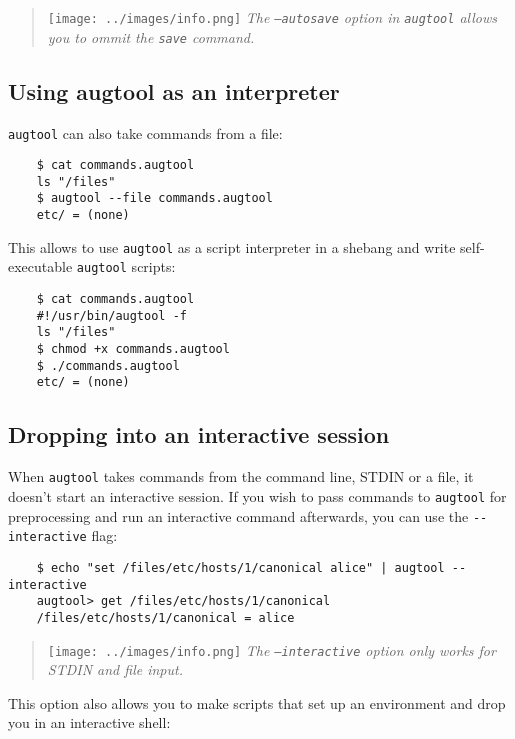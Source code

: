 
\begin{quote}
\texttt{[image: ../images/info.png]} \emph{The \texttt{--autosave} option in \texttt{augtool} allows you to ommit the \texttt{save} command.}

\end{quote}
\subsection{Using augtool as an interpreter}

\verb!augtool! can also take commands from a file:

 

\begin{verbatim}
    $ cat commands.augtool
    ls "/files"
    $ augtool --file commands.augtool
    etc/ = (none)
\end{verbatim}

This allows to use \verb!augtool! as a script interpreter in a shebang and write self-executable \verb!augtool! scripts:

\begin{verbatim}
    $ cat commands.augtool
    #!/usr/bin/augtool -f
    ls "/files"
    $ chmod +x commands.augtool
    $ ./commands.augtool
    etc/ = (none)
\end{verbatim}

\subsection{Dropping into an interactive session}

When \verb!augtool! takes commands from the command line, STDIN or a file, it doesn't start an interactive session. If you wish to pass commands to \verb!augtool! for preprocessing and run an interactive command afterwards, you can use the \verb!--interactive! flag:

  

\begin{verbatim}
    $ echo "set /files/etc/hosts/1/canonical alice" | augtool --interactive
    augtool> get /files/etc/hosts/1/canonical
    /files/etc/hosts/1/canonical = alice
\end{verbatim}

\begin{quote}
\texttt{[image: ../images/info.png]} \emph{The \texttt{--interactive} option only works for STDIN and file input.}

\end{quote}
This option also allows you to make scripts that set up an environment and drop you in an interactive shell:

